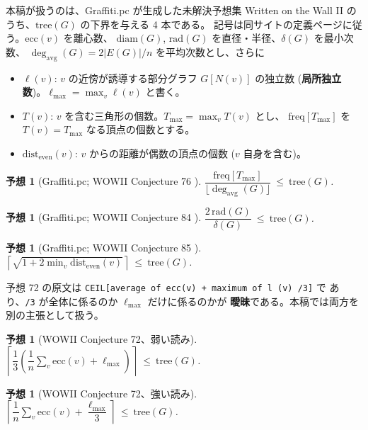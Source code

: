 \documentclass[paper=a4,fontsize=10.5pt,jafontsize=10.5pt]{jlreq}
\theoremstyle{plain}
\newtheorem{conjecture}[theorem]{予想}
\theoremstyle{definition}
\begin{document}
本稿が扱うのは、Graffiti.pc が生成した未解決予想集 Written on the Wall II
\cite{wowii} のうち、$\mathrm{tree}(G)$ の下界を与える 4 本である。
記号は同サイトの定義ページに従う。$\mathrm{ecc}(v)$ を離心数、
$\mathrm{diam}(G)$, $\mathrm{rad}(G)$ を直径・半径、$\delta(G)$ を最小次数、
$\deg_{\mathrm{avg}}(G) = 2|E(G)|/n$ を平均次数とし、さらに

\begin{itemize}
\item $\ell(v)$: $v$ の近傍が誘導する部分グラフ $G[N(v)]$ の独立数
      (\textbf{局所独立数})。$\ell_{\max} = \max_v \ell(v)$ と書く。
\item $T(v)$: $v$ を含む三角形の個数。$T_{\max} = \max_v T(v)$ とし、
      $\mathrm{freq}[T_{\max}]$ を $T(v) = T_{\max}$ なる頂点の個数とする。
\item $\mathrm{dist}_{\mathrm{even}}(v)$: $v$ からの距離が偶数の頂点の個数
      ($v$ 自身を含む)。
\end{itemize}

\begin{conjecture}[Graffiti.pc; WOWII Conjecture 76 \cite{wowii}]\label{conj:76}
$\dfrac{\mathrm{freq}[T_{\max}]}{\lfloor \deg_{\mathrm{avg}}(G) \rfloor}
 \ \le \ \mathrm{tree}(G)$.
\end{conjecture}

\begin{conjecture}[Graffiti.pc; WOWII Conjecture 84 \cite{wowii}]\label{conj:84}
$\dfrac{2\,\mathrm{rad}(G)}{\delta(G)} \ \le \ \mathrm{tree}(G)$.
\end{conjecture}

\begin{conjecture}[Graffiti.pc; WOWII Conjecture 85 \cite{wowii}]\label{conj:85}
$\left\lceil \sqrt{1 + 2 \min_{v} \mathrm{dist}_{\mathrm{even}}(v)}
 \right\rceil \ \le \ \mathrm{tree}(G)$.
\end{conjecture}

予想 72 の原文は \texttt{CEIL[average of ecc(v) + maximum of l (v) /3]} で
あり、\texttt{/3} が全体に係るのか $\ell_{\max}$ だけに係るのかが
\textbf{曖昧}である。本稿では両方を別の主張として扱う。

\begin{conjecture}[WOWII Conjecture 72、弱い読み]\label{conj:72a}
$\left\lceil \dfrac{1}{3}\left(
   \dfrac{1}{n}\sum_{v} \mathrm{ecc}(v) + \ell_{\max} \right)
 \right\rceil \ \le \ \mathrm{tree}(G)$.
\end{conjecture}

\begin{conjecture}[WOWII Conjecture 72、強い読み]\label{conj:72b}
$\left\lceil \dfrac{1}{n}\sum_{v} \mathrm{ecc}(v)
   + \dfrac{\ell_{\max}}{3} \right\rceil \ \le \ \mathrm{tree}(G)$.
\end{conjecture}
\end{document}
